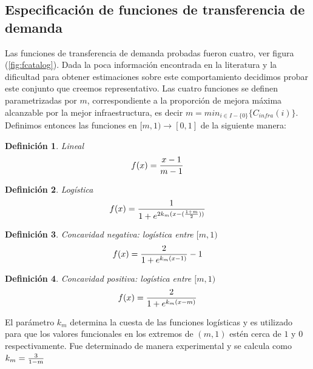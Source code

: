 \documentclass{article}
\newtheorem{definition}{Definición}
\begin{document}
  \subsection{Especificación de funciones de transferencia de demanda}

  Las funciones de transferencia de demanda probadas fueron cuatro, ver figura (\ref{fig:fcatalog}). Dada la poca información encontrada en la literatura y la dificultad para obtener estimaciones sobre este comportamiento decidimos probar este conjunto que creemos representativo. Las cuatro funciones se definen parametrizadas por $m$, correspondiente a la proporción de mejora máxima alcanzable por la mejor infraestructura, es decir $m = min_{i \in I - \{0\}} \{ C_{infra}(i) \}$. Definimos entonces las funciones en $[m, 1) \rightarrow [0, 1]$ de la siguiente manera:

  \begin{definition}
    Lineal
    \begin{align}
        f(x) = {x -1 \over m - 1}
    \end{align}
  \end{definition}

  \begin{definition}
    Logística
    \begin{align}
        f(x) = {1 \over 1 + e^{2k_m(x - ({1 + m \over 2}))}}
    \end{align}
  \end{definition}

  \begin{definition}
    Concavidad negativa: logística entre $[m, 1)$
    \begin{align}
        f(x) = {2 \over 1 + e^{k_m(x - 1)}} - 1
    \end{align}
  \end{definition}

  \begin{definition}
    Concavidad positiva: logística entre $[m, 1)$
    \begin{align}
        f(x) = {2 \over 1 + e^{k_m(x - m)}}
    \end{align}
  \end{definition}

  El parámetro $k_m$ determina la cuesta de las funciones logísticas y es utilizado para que los valores funcionales en los extremos de $(m, 1)$ estén cerca de $1$ y $0$ respectivamente. Fue determinado de manera experimental y se calcula como $k_m = {3 \over 1 - m}$
\end{document}
